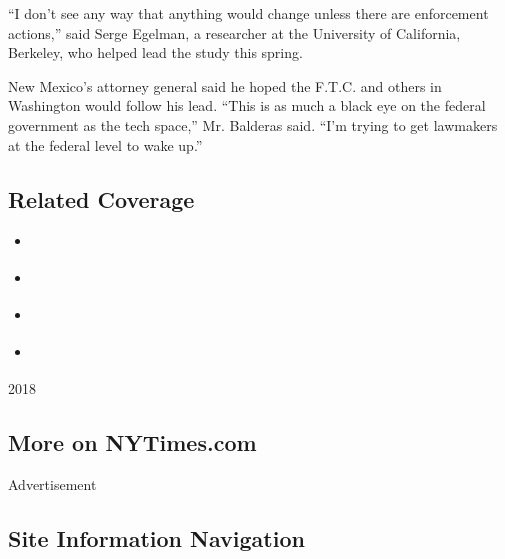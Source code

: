 ``I don't see any way that anything would change unless there are
enforcement actions,'' said Serge Egelman, a researcher at the
University of California, Berkeley, who helped lead the study this
spring.

New Mexico's attorney general said he hoped the F.T.C. and others in
Washington would follow his lead. ``This is as much a black eye on the
federal government as the tech space,'' Mr. Balderas said. ``I'm trying
to get lawmakers at the federal level to wake up.''

\hypertarget{related-coverage}{%
\subsection{Related Coverage}\label{related-coverage}}

\begin{itemize}
\tightlist
\item
  \href{https://www.nytimes.com/2018/08/26/technology/tech-industry-federal-privacy-law.html}{}
\item
  \href{https://www.nytimes.com/2018/06/28/technology/california-online-privacy-law.html}{}
\item
  \href{https://www.nytimes.com/2018/05/19/technology/phone-apps-stalking.html}{}
\item
  \href{https://www.nytimes.com/2018/07/29/business/for-sale-survey-data-on-millions-of-high-school-students.html}{}
\end{itemize}

2018

\hypertarget{more-on-nytimescom}{%
\subsection{More on NYTimes.com}\label{more-on-nytimescom}}

Advertisement

\hypertarget{site-information-navigation}{%
\subsection{Site Information
Navigation}\label{site-information-navigation}}

